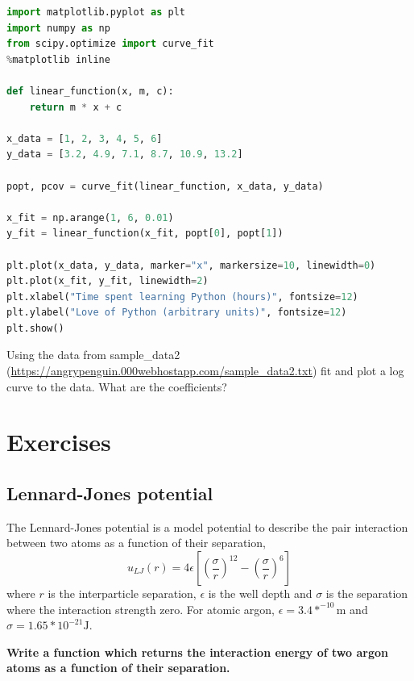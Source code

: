 \begin{lstlisting}[language=Python]
import matplotlib.pyplot as plt
import numpy as np
from scipy.optimize import curve_fit
%matplotlib inline

def linear_function(x, m, c):
    return m * x + c

x_data = [1, 2, 3, 4, 5, 6]
y_data = [3.2, 4.9, 7.1, 8.7, 10.9, 13.2]

popt, pcov = curve_fit(linear_function, x_data, y_data)

x_fit = np.arange(1, 6, 0.01)
y_fit = linear_function(x_fit, popt[0], popt[1])

plt.plot(x_data, y_data, marker="x", markersize=10, linewidth=0)
plt.plot(x_fit, y_fit, linewidth=2)
plt.xlabel("Time spent learning Python (hours)", fontsize=12)
plt.ylabel("Love of Python (arbitrary units)", fontsize=12)
plt.show()
\end{lstlisting}
\begin{task}Using the data from sample\_data2 (\url{https://angrypenguin.000webhostapp.com/sample_data2.txt}) fit and plot a log curve to the data. What are the coefficients?\end{task}

\section{Exercises}
	\subsection{Lennard-Jones potential}\label{LJ_excercise}
		The Lennard-Jones potential is a model potential to describe the pair interaction between two atoms as a function of their separation,
\begin{equation}u_{LJ}(r) = 4\epsilon \left [ \left (\frac{\sigma}{r} \right )^{12}- \left (\frac{\sigma}{r} \right )^{6} \right ]\end{equation}
	where $r$ is the interparticle separation, $\epsilon$ is the well depth and $\sigma$ is the separation where the interaction strength zero. For atomic argon, $\epsilon = 3.4*^{-10} \mathrm{m}$ and $\sigma= 1.65*10^{-21} \mathrm{J}$.
	
\textbf{Write a function which returns the interaction energy of two argon atoms as a function of their separation.}

